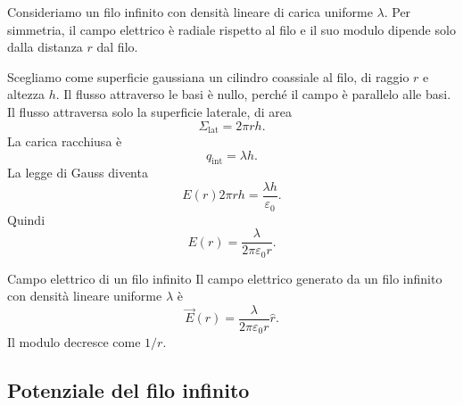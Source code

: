 \documentclass[a4paper]{article}
\begin{document}
Consideriamo un filo infinito con densità lineare di carica uniforme \(\lambda\). Per simmetria, il campo elettrico è radiale rispetto al filo e il suo modulo dipende solo dalla distanza \(r\) dal filo.

\begin{center}
\end{center}

Scegliamo come superficie gaussiana un cilindro coassiale al filo, di raggio \(r\) e altezza \(h\). Il flusso attraverso le basi è nullo, perché il campo è parallelo alle basi. Il flusso attraversa solo la superficie laterale, di area
\[
    \Sigma_{\mathrm{lat}}=2\pi rh.
\]
La carica racchiusa è
\[
    q_{\mathrm{int}}=\lambda h.
\]
La legge di Gauss diventa
\[
    E(r)2\pi rh=\frac{\lambda h}{\varepsilon_0}.
\]
Quindi
\[
    E(r)=\frac{\lambda}{2\pi\varepsilon_0r}.
\]

\begin{snippettheorem}{Campo elettrico di un filo infinito}
    Il campo elettrico generato da un filo infinito con densità lineare uniforme \(\lambda\) è
    \[
        \vec{E}(r)=\frac{\lambda}{2\pi\varepsilon_0r}\hat{r}.
    \]
    Il modulo decresce come \(1/r\).
\end{snippettheorem}

\begin{center}
\end{center}

\subsection{Potenziale del filo infinito}
\end{document}

